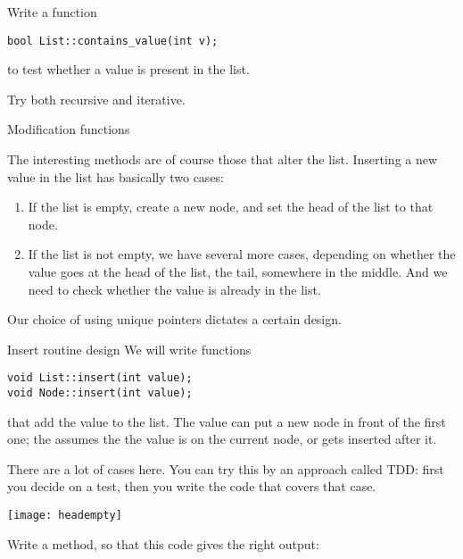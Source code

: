 \begin{exercise}
  \label{ex:list-contains}
  Write a function
\begin{verbatim}
bool List::contains_value(int v);
\end{verbatim}
to test whether a value is present in the list.

Try both recursive and iterative.
\end{exercise}

 {Modification functions}

The interesting methods are of course those that alter the
list. Inserting a new value in the list has basically two cases:
\begin{enumerate}
\item If the list is empty, create a new node, and set the head of the
  list to that node.
\item If the list is not empty, we have several more cases, depending
  on whether the value goes at the head of the list, the tail,
  somewhere in the middle. And we need to check whether the value is
  already in the list.
\end{enumerate}
Our choice of using unique pointers dictates a certain design.

\begin{block}{Insert routine design}
  \label{sl:linklist-insert-proto}
  We will write functions
\begin{verbatim}
void List::insert(int value);
void Node::insert(int value);
\end{verbatim}
that add the value to the list. The  value can put a
new node in front of the first one; the  assumes the
the value is on the current node, or gets inserted after it.
\end{block}

There are a lot of cases here. You can try this by an approach called
\acf{TDD}: first you decide on a test, then you write the code that
covers that case.

\par

\texttt{[image: headempty]}

\begin{exercise}
  Write a  method, so that this code gives the right
  output:
\end{exercise}

\par

